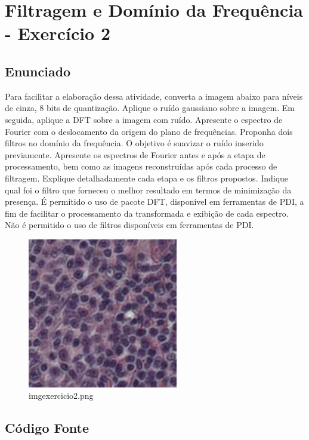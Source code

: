 \documentclass[10pt,a4paper]{article}
\begin{document}
\pagebreak

\section{Filtragem e Domínio da Frequência - Exercício 2}

\subsection{Enunciado}

Para facilitar a elaboração dessa atividade, converta a imagem abaixo para níveis de cinza, 8 bits de quantização. Aplique o ruído gaussiano sobre a imagem. Em seguida, aplique a DFT sobre a imagem com ruído. Apresente o espectro de Fourier com o deslocamento da origem do plano de frequências. Proponha dois filtros no domínio da frequência. O objetivo é suavizar o ruído inserido previamente. Apresente os espectros de Fourier antes e após a etapa de processamento, bem como as imagens reconstruídas após cada processo de filtragem. Explique detalhadamente cada etapa e os filtros propostos. Indique qual foi o filtro que forneceu o melhor resultado em termos de minimização da presença. É permitido o uso de pacote DFT, disponível em ferramentas de PDI, a fim de facilitar o processamento da transformada e exibição de cada espectro. Não é permitido o uso de filtros disponíveis em ferramentas de PDI.

\begin{figure}[H]
    \centering
    \includegraphics[scale=0.9]{images_original/10/img_exercicio2.png}
    \caption{img\textunderscore exercicio2.png}
\end{figure}

\subsection{Código Fonte}
\end{document}
